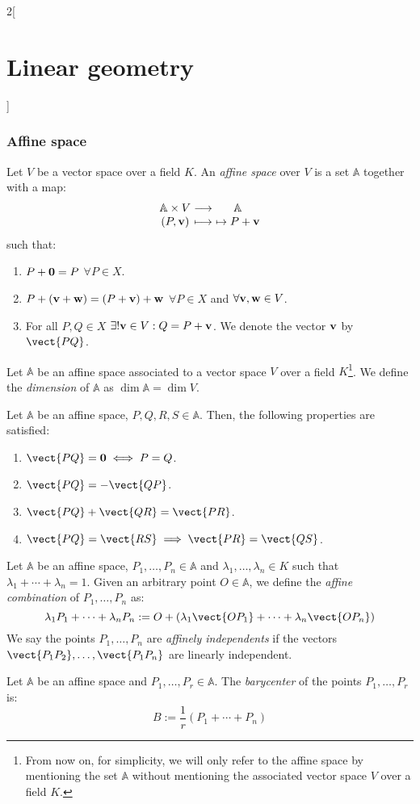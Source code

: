 \documentclass[../../../main_math.tex]{subfiles}
\begin{document}
\begin{multicols}{2}[\section{Linear geometry}]
  \subsubsection{Affine space}
  \begin{definition}
    Let $V$ be a vector space over a field $K$. An \emph{affine space} over $V$ is a set $\mathbb{A}$ together with a map:
    $$\function{}{\mathbb{A}\times V}{\mathbb{A}}{(P,\vf{v})}{\mapsto P+\vf{v}}$$
    such that:
    \begin{enumerate}
      \item $P+\boldsymbol{\mathrm{0}}=P$ $\forall P\in X$.
      \item $P+(\boldsymbol{\mathrm{v}}+\boldsymbol{\mathrm{w}})=(P+\boldsymbol{\mathrm{v}})+\boldsymbol{\mathrm{w}}$ $\forall P\in X$ and $\forall\boldsymbol{\mathrm{v}},\boldsymbol{\mathrm{w}}\in V$.
      \item For all $P,Q\in X$ $\exists!\boldsymbol{\mathrm{v}}\in V:Q=P+\boldsymbol{\mathrm{v}}$. We denote the vector $\boldsymbol{\mathrm{v}}$ by $\vect{PQ}$.
    \end{enumerate}
  \end{definition}
  \begin{definition}
    Let $\mathbb{A}$ be an affine space associated to a vector space $V$ over a field $K$\footnote{From now on, for simplicity, we will only refer to the affine space by mentioning the set $\mathbb{A}$ without mentioning the associated vector space $V$ over a field $K$.}. We define the \emph{dimension} of $\mathbb{A}$ as $\dim\mathbb{A}=\dim V$.
  \end{definition}
  \begin{proposition}
    Let $\mathbb{A}$ be an affine space, $P,Q,R,S\in\mathbb{A}$. Then, the following properties are satisfied:
    \begin{enumerate}
      \item $\vect{PQ}=\vf{0}\iff P=Q$.
      \item $\vect{PQ}=-\vect{QP}$.
      \item $\vect{PQ}+\vect{QR}=\vect{PR}$.
      \item $\vect{PQ}=\vect{RS}\implies\vect{PR}=\vect{QS}$.
    \end{enumerate}
  \end{proposition}
  \begin{definition}
    Let $\mathbb{A}$ be an affine space, $P_1,\ldots,P_n\in\mathbb{A}$ and $\lambda_1,\ldots,\lambda_n\in K$ such that $\lambda_1+\cdots+\lambda_n=1$. Given an arbitrary point $O\in\mathbb{A}$, we define the \emph{affine combination} of $P_1,\ldots,P_n$ as: $$\lambda_1P_1+\cdots+\lambda_nP_n:=O+\left(\lambda_1\vect{OP_1}+\cdots+\lambda_n\vect{OP_n}\right)$$ We say the points $P_1,\ldots,P_n$ are \emph{affinely independents} if the vectors $\vect{P_1P_2},\ldots,\vect{P_1P_n}$ are linearly independent.
  \end{definition}
  \begin{definition}
    Let $\mathbb{A}$ be an affine space and $P_1,\ldots,P_r\in\mathbb{A}$. The \emph{barycenter} of the points $P_1,\ldots,P_r$ is: $$B:=\frac{1}{r}\left(P_1+\cdots+P_n\right)$$
  \end{definition}

\end{multicols}
\end{document}
